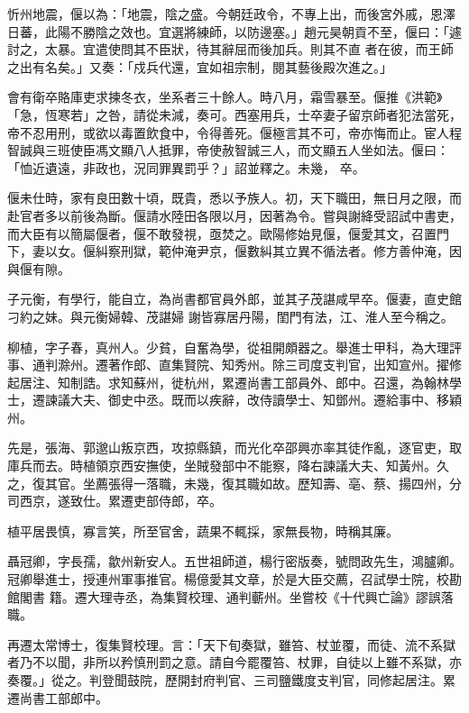\begin{pinyinscope}
 忻州地震，偃以為：「地震，陰之盛。今朝廷政令，不專上出，而後宮外戚，恩澤日蕃，此陽不勝陰之效也。宜選將練師，以防邊塞。」趙元昊朝貢不至，偃曰：「遽討之，太暴。宜遣使問其不臣狀，待其辭屈而後加兵。則其不直
 者在彼，而王師之出有名矣。」又奏：「戍兵代還，宜如祖宗制，閱其藝後殿次進之。」



 會有衛卒賂庫吏求揀冬衣，坐系者三十餘人。時八月，霜雪暴至。偃推《洪範》「急，恆寒若」之咎，請從未減，奏可。西塞用兵，士卒妻子留京師者犯法當死，帝不忍用刑，或欲以毒置飲食中，令得善死。偃極言其不可，帝亦悔而止。宦人程智誠與三班使臣馮文顯八人抵罪，帝使赦智誠三人，而文顯五人坐如法。偃曰：「恤近遺遠，非政也，況同罪異罰乎？」詔並釋之。未幾，
 卒。



 偃未仕時，家有良田數十頃，既貴，悉以予族人。初，天下職田，無日月之限，而赴官者多以前後為斷。偃請水陸田各限以月，因著為令。嘗與謝絳受詔試中書吏，而大臣有以簡屬偃者，偃不敢發視，亟焚之。歐陽修始見偃，偃愛其文，召置門下，妻以女。偃糾察刑獄，範仲淹尹京，偃數糾其立異不循法者。修方善仲淹，因與偃有隙。



 子元衡，有學行，能自立，為尚書都官員外郎，並其子茂諶咸早卒。偃妻，直史館刁約之妹。與元衡婦韓、茂諶婦
 謝皆寡居丹陽，閨門有法，江、淮人至今稱之。



 柳植，字子春，真州人。少貧，自奮為學，從祖開頗器之。舉進士甲科，為大理評事、通判滁州。遷著作郎、直集賢院、知秀州。除三司度支判官，出知宣州。擢修起居注、知制誥。求知蘇州，徙杭州，累遷尚書工部員外、郎中。召還，為翰林學士，遷諫議大夫、御史中丞。既而以疾辭，改侍讀學士、知鄧州。遷給事中、移穎州。



 先是，張海、郭邈山叛京西，攻掠縣鎮，而光化卒邵興亦率其徒作亂，逐官吏，取
 庫兵而去。時植領京西安撫使，坐賊發部中不能察，降右諫議大夫、知黃州。久之，復其官。坐薦張得一落職，未幾，復其職如故。歷知壽、亳、蔡、揚四州，分司西京，遂致仕。累遷吏部侍郎，卒。



 植平居畏慎，寡言笑，所至官舍，蔬果不輒採，家無長物，時稱其廉。



 聶冠卿，字長孺，歙州新安人。五世祖師道，楊行密版奏，號問政先生，鴻臚卿。冠卿舉進士，授連州軍事推官。楊億愛其文章，於是大臣交薦，召試學士院，校勘館閣書
 籍。遷大理寺丞，為集賢校理、通判蘄州。坐嘗校《十代興亡論》謬誤落職。



 再遷太常博士，復集賢校理。言：「天下旬奏獄，雖笞、杖並覆，而徒、流不系獄者乃不以聞，非所以矜慎刑罰之意。請自今罷覆笞、杖罪，自徒以上雖不系獄，亦奏覆。」從之。判登聞鼓院，歷開封府判官、三司鹽鐵度支判官，同修起居注。累遷尚書工部郎中。




\end{pinyinscope}
